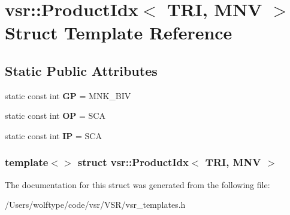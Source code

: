 \hypertarget{structvsr_1_1_product_idx_3_01_t_r_i_00_01_m_n_v_01_4}{\section{vsr\-:\-:Product\-Idx$<$ T\-R\-I, M\-N\-V $>$ Struct Template Reference}
\label{structvsr_1_1_product_idx_3_01_t_r_i_00_01_m_n_v_01_4}
}
\subsection*{Static Public Attributes}
\begin{DoxyCompactItemize}
\item 
\hypertarget{structvsr_1_1_product_idx_3_01_t_r_i_00_01_m_n_v_01_4_a4be9d0803341421e9759a99f20b25059}{static const int {\bfseries G\-P} = M\-N\-K\-\_\-\-B\-I\-V}\label{structvsr_1_1_product_idx_3_01_t_r_i_00_01_m_n_v_01_4_a4be9d0803341421e9759a99f20b25059}

\item 
\hypertarget{structvsr_1_1_product_idx_3_01_t_r_i_00_01_m_n_v_01_4_a4c8e27941bf8d138f8be632f8057fff9}{static const int {\bfseries O\-P} = S\-C\-A}\label{structvsr_1_1_product_idx_3_01_t_r_i_00_01_m_n_v_01_4_a4c8e27941bf8d138f8be632f8057fff9}

\item 
\hypertarget{structvsr_1_1_product_idx_3_01_t_r_i_00_01_m_n_v_01_4_a92780bf780f1edb4bdba6a03e37bf3ec}{static const int {\bfseries I\-P} = S\-C\-A}\label{structvsr_1_1_product_idx_3_01_t_r_i_00_01_m_n_v_01_4_a92780bf780f1edb4bdba6a03e37bf3ec}

\end{DoxyCompactItemize}
\subsubsection*{template$<$$>$ struct vsr\-::\-Product\-Idx$<$ T\-R\-I, M\-N\-V $>$}



The documentation for this struct was generated from the following file\-:\begin{DoxyCompactItemize}
\item 
/\-Users/wolftype/code/vsr/\-V\-S\-R/vsr\-\_\-templates.\-h\end{DoxyCompactItemize}
